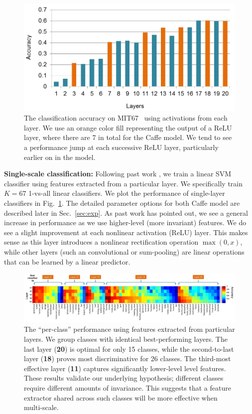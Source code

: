 \documentclass[10pt,twocolumn,letterpaper]{article}
\begin{document}
\begin{figure}[t!]
\centering
	\includegraphics[width=.8\columnwidth]{fig/fig_layer_caffe.png}

\caption{The classification accuracy on MIT67~\cite{MIT67} using activations from each layer. We use an orange color fill representing the output of a ReLU layer, where there are 7 in total for the Caffe model. We tend to see a performance jump at each successive ReLU layer, particularly earlier on in the model.}
\label{fig:layer_MIT67}
\end{figure}

{\bf Single-scale classification:} Following past work \cite{cnn_baseline}, we train a linear SVM classifier using features extracted from a particular layer. We specifically train $K=67$ 1-vs-all linear classifiers.
We plot the performance of single-layer classifiers in Fig.~\ref{fig:layer_MIT67}. The detailed parameter options for both Caffe model are described later in Sec.~\ref{sec:exp}. As past work has pointed out, we see a general increase in performance as we use higher-level (more invariant) features. We do see a slight improvement at each nonlinear activation (ReLU) layer. This makes sense as this layer introduces a nonlinear rectification operation $\max(0,x)$, while other layers (such an convolutional or sum-pooling) are linear operations that can be learned by a linear predictor.



\begin{figure}[ht!]
\centering
	\includegraphics[width=1\textwidth]{fig/fig_level_perf.png}
\caption{The ``per-class'' performance using features extracted from particular layers. We group classes with identical best-performing layers. The last layer ({\bf 20}) is optimal for only 15 classes, while the second-to-last layer ({\bf 18}) proves most discriminative for 26 classes. The third-most effective layer ({\bf 11}) captures significantly lower-level level features. These results validate our underlying hypothesis; different classes require different amounts of invariance. This suggests that a feature extractor shared across such classes will be more effective when multi-scale.}
\label{fig:level_perf}
\end{figure}
\end{document}
